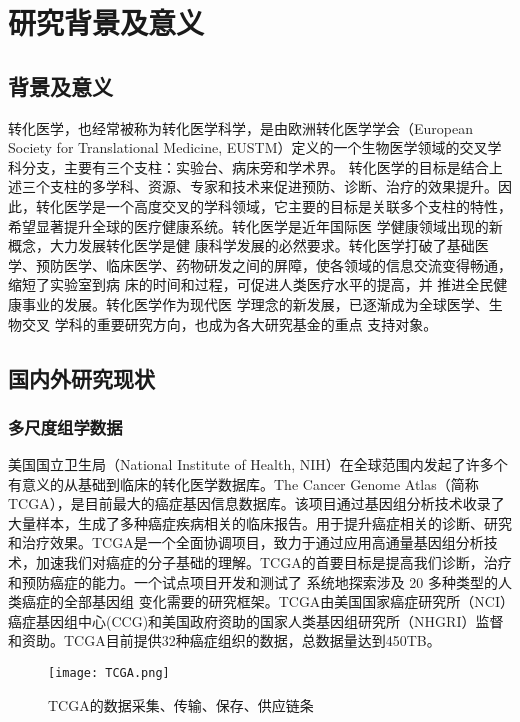 
\chapter{研究背景及意义}

\section{背景及意义}
转化医学，也经常被称为转化医学科学，是由欧洲转化医学学会（European Society for Translational Medicine, EUSTM）定义的一个生物医学领域的交叉学科分支\cite{Cohrs:2015dw}，主要有三个支柱：实验台、病床旁和学术界。 转化医学的目标是结合上述三个支柱的多学科、资源、专家和技术来促进预防、诊断、治疗的效果提升。因此，转化医学是一个高度交叉的学科领域，它主要的目标是关联多个支柱的特性，希望显著提升全球的医疗健康系统。转化医学是近年国际医 学健康领域出现的新概念，大力发展转化医学是健 康科学发展的必然要求。转化医学打破了基础医 学、预防医学、临床医学、药物研发之间的屏障，使各领域的信息交流变得畅通，缩短了实验室到病 床的时间和过程，可促进人类医疗水平的提高，并 推进全民健康事业的发展。转化医学作为现代医 学理念的新发展，已逐渐成为全球医学、生物交叉 学科的重要研究方向，也成为各大研究基金的重点 支持对象。



\section{国内外研究现状}
\subsection{多尺度组学数据}
美国国立卫生局（National Institute of Health, NIH）在全球范围内发起了许多个有意义的从基础到临床的转化医学数据库。The Cancer Genome Atlas（简称TCGA），是目前最大的癌症基因信息数据库\cite{Hoadley:2014kd}。该项目通过基因组分析技术收录了大量样本，生成了多种癌症疾病相关的临床报告。用于提升癌症相关的诊断、研究和治疗效果。TCGA是一个全面协调项目，致力于通过应用高通量基因组分析技术，加速我们对癌症的分子基础的理解。TCGA的首要目标是提高我们诊断，治疗和预防癌症的能力。一个试点项目开发和测试了 系统地探索涉及 20 多种类型的人类癌症的全部基因组 变化需要的研究框架。TCGA由美国国家癌症研究所（NCI）癌症基因组中心(CCG)和美国政府资助的国家人类基因组研究所（NHGRI）监督和资助。TCGA目前提供32种癌症组织的数据，总数据量达到450TB。
\begin{figure}[htbp]
	\centering
	\texttt{[image: TCGA.png]}
	\caption{TCGA的数据采集、传输、保存、供应链条}\label{fig:TCGA}
\end{figure}


